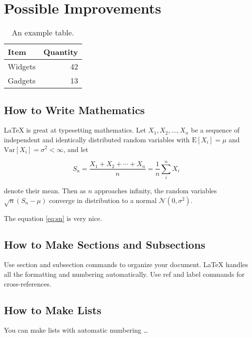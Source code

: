 \documentclass[a4paper]{article}
\begin{document}
\section{Possible Improvements}

\newpage

\begin{table}
\centering
\begin{tabular}{l|r}
Item & Quantity \\\hline
Widgets & 42 \\
Gadgets & 13
\end{tabular}
\caption{\label{tab:widgets}An example table.}
\end{table}

\subsection{How to Write Mathematics}

\LaTeX{} is great at typesetting mathematics. Let $X_1, X_2, \ldots, X_n$ be a sequence of independent and identically distributed random variables with $\text{E}[X_i] = \mu$ and $\text{Var}[X_i] = \sigma^2 < \infty$, and let

\begin{equation}
S_n = \frac{X_1 + X_2 + \cdots + X_n}{n}
      = \frac{1}{n}\sum_{i}^{n} X_i
\label{eq:sn}
\end{equation}

denote their mean. Then as $n$ approaches infinity, the random variables $\sqrt{n}(S_n - \mu)$ converge in distribution to a normal $\mathcal{N}(0, \sigma^2)$.

The equation \ref{eq:sn} is very nice.

\subsection{How to Make Sections and Subsections}

Use section and subsection commands to organize your document. \LaTeX{} handles all the formatting and numbering automatically. Use ref and label commands for cross-references.

\subsection{How to Make Lists}

You can make lists with automatic numbering \dots
\end{document}
